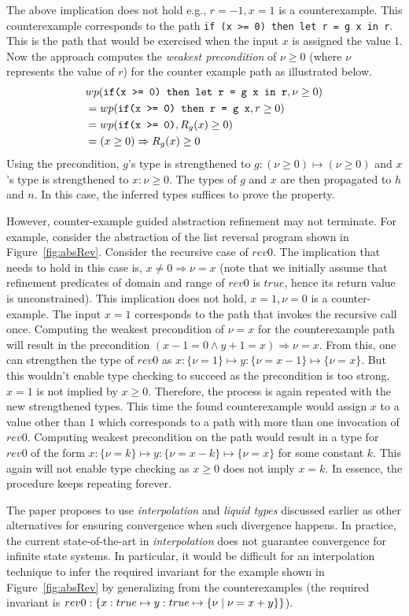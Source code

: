 The above implication does not hold e.g., $r = -1, x =1$ is a counterexample.
This counterexample corresponds to the path \texttt{if (x >= 0) then let r = g x in r}.
This is the path that would be exercised when the input $x$ is assigned the value 1.
Now the approach computes the \emph{weakest precondition} of $\nu \ge 0$ (where $\nu$ represents 
the value of $r$) for the counter example path as illustrated below.
%
\begin{align*}
& wp(\text{\texttt{if(x >= 0) then let r = g x in r}}, \nu \ge 0) \\
& = wp(\text{\texttt{if(x >= 0) then r = g x}}, r \ge 0)\\
& = wp(\text{\texttt{if(x >= 0)}}, R_g(x) \ge 0) \\
& = (x \ge 0) \Rightarrow R_g(x) \ge 0
\end{align*}
%
Using the precondition, $g$'s type is strengthened to $g: (\nu \ge 0) \mapsto (\nu \ge 0)$ and 
$x$'s type is strengthened  to $x: \nu \ge 0$. The types of $g$ and $x$ are then propagated to $h$ and $n$.
In this case, the inferred types suffices to prove the property.

However, counter-example guided abstraction refinement may not terminate. For example, 
consider the abstraction of the list reversal program shown in Figure~\ref{fig:absRev}.
Consider the recursive case of $rev0$. The implication that needs to hold in this case is,
$x \ne 0 \Rightarrow \nu = x$ (note that we initially assume that refinement predicates of
domain and range of $rev0$ is $true$, hence its return value is unconstrained).
This implication does not hold, $x = 1,\nu = 0$ is a counter-example.
The input $x = 1$ corresponds to the path that invokes the recursive call once. 
Computing the weakest precondition of $\nu = x$ for the counterexample path will result in the 
precondition $(x - 1 = 0 \wedge y + 1 = x) \Rightarrow \nu = x$. From this, one can strengthen
the type of $rev0$ as $x:\{ \nu = 1 \} \mapsto y:\{\nu=x - 1\} \mapsto \{\nu = x \}$.
But this wouldn't enable type checking to succeed as the precondition is too strong, 
$x = 1$ is not implied by $x \ge 0$. 
Therefore, the process is again repeated with the  new strengthened types. This time
the found counterexample would assign $x$ to a value other than $1$ which corresponds 
to a path with more than one invocation of $rev0$. Computing weakest precondition on the path
would result in a type for $rev0$ of the form  
$x:\{ \nu = k \} \mapsto y:\{ \nu = x - k \} \mapsto \{\nu = x \}$  
for some constant $k$.
This again will not enable type checking as $x \ge 0$ does not imply $x = k$.
In essence, the procedure keeps repeating forever.

The paper proposes to use \emph{interpolation} and \emph{liquid types} \cite{rjhala:PLDI08} 
discussed earlier as other alternatives for ensuring convergence when such divergence happens. 
In practice, the current state-of-the-art in \emph{interpolation} does not guarantee convergence for infinite state systems. In particular, it would be difficult for an interpolation technique 
to infer the required invariant for the example shown in Figure~\ref{fig:absRev}
by generalizing from the counterexamples
(the required invariant is 
$rev0: \{ x:true \mapsto y:true \mapsto \{ \nu \; | \; \nu=x+y \} \}$).